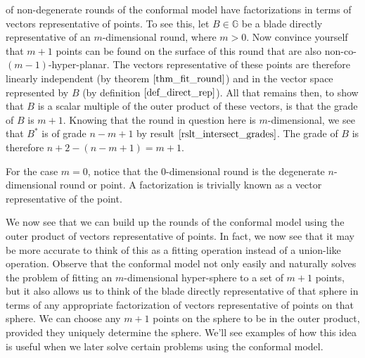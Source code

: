 \documentclass[12pt]{article}
\newcommand{\G}{\mathbb{G}}
\begin{document}
of non-degenerate rounds of the conformal model have factorizations in
terms of vectors representative of points.  To see this, let $B\in\G$ be
a blade directly representative of an $m$-dimensional round, where $m>0$.  Now convince yourself
that $m+1$ points can be found on the surface of this round that are also
non-co-$(m-1)$-hyper-planar.  The vectors representative of these
points are therefore linearly independent (by theorem $\eqref{thm_fit_round}$) and
in the vector space represented by $B$ (by definition $\eqref{def_direct_rep}$).
All that remains then, to show that $B$ is a scalar multiple of the outer product
of these vectors, is that the grade of $B$ is $m+1$.  Knowing that the round in question
here is $m$-dimensional, we see that $B^*$ is of grade $n-m+1$ by result $\eqref{rslt_intersect_grades}$.
The grade of $B$ is therefore $n+2-(n-m+1)=m+1$.

For the case $m=0$, notice that the 0-dimensional round is the degenerate $n$-dimensional round
or point.  A factorization is trivially known as a vector representative of the point.

We now see that we can build up the rounds of the conformal model using
the outer product of vectors representative of points.  In fact, we now see
that it may be more accurate to think of this as a fitting operation instead of
a union-like operation.  Observe that the conformal model not only easily and
naturally solves the problem of fitting an $m$-dimensional hyper-sphere
to a set of $m+1$ points, but it also allows us to think of the blade directly
representative of that sphere in terms of any appropriate factorization
of vectors representative of points on that sphere.  We
can choose any $m+1$ points on the sphere to be in the outer product, provided they uniquely
determine the sphere.  We'll see examples of how this idea is
useful when we later solve certain problems using the conformal model.
\end{document}

